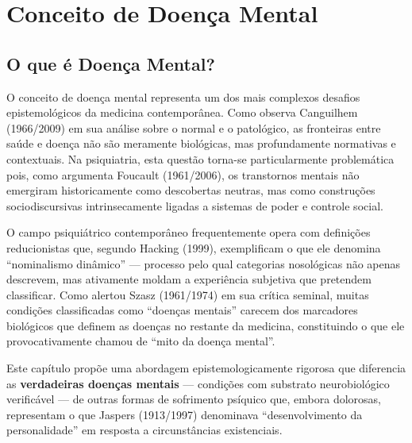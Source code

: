 \chapter{Conceito de Doença Mental}
\label{ch:doenca-mental}

\section{O que é Doença Mental?}
\label{sec:o-que-e}

O conceito de doença mental representa um dos mais complexos desafios epistemológicos da medicina contemporânea. Como observa Canguilhem (1966/2009) em sua análise sobre o normal e o patológico, as fronteiras entre saúde e doença não são meramente biológicas, mas profundamente normativas e contextuais. Na psiquiatria, esta questão torna-se particularmente problemática pois, como argumenta Foucault (1961/2006), os transtornos mentais não emergiram historicamente como descobertas neutras, mas como construções sociodiscursivas intrinsecamente ligadas a sistemas de poder e controle social.

O campo psiquiátrico contemporâneo frequentemente opera com definições reducionistas que, segundo Hacking (1999), exemplificam o que ele denomina \enquote{nominalismo dinâmico} --- processo pelo qual categorias nosológicas não apenas descrevem, mas ativamente moldam a experiência subjetiva que pretendem classificar. Como alertou Szasz (1961/1974) em sua crítica seminal, muitas condições classificadas como \enquote{doenças mentais} carecem dos marcadores biológicos que definem as doenças no restante da medicina, constituindo o que ele provocativamente chamou de \enquote{mito da doença mental}.

Este capítulo propõe uma abordagem epistemologicamente rigorosa que diferencia as \textbf{verdadeiras doenças mentais} --- condições com substrato neurobiológico verificável --- de outras formas de sofrimento psíquico que, embora dolorosas, representam o que Jaspers (1913/1997) denominava \enquote{desenvolvimento da personalidade} em resposta a circunstâncias existenciais.

